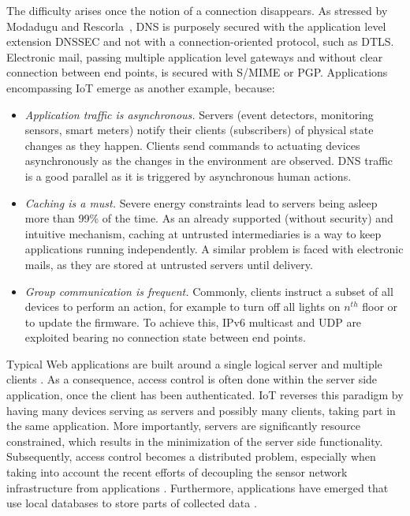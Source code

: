 \documentclass[conference]{IEEEtran}
\begin{document}
The difficulty arises once the notion of a connection disappears. As stressed by
Modadugu and Rescorla~\cite{dtls}, DNS is purposely secured with the application
level extension DNSSEC and not with a connection-oriented protocol, such as DTLS.  Electronic mail, passing multiple application level gateways and without clear connection between end points, is secured with S/MIME or PGP. Applications encompassing IoT emerge as another example, because:
 
 \begin{itemize}
 \item \textit{Application traffic is asynchronous.} Servers (event detectors, monitoring sensors, smart meters) notify their clients (subscribers) of physical state changes as they happen. Clients send commands to actuating devices asynchronously as the changes in the environment are observed. DNS traffic is a good parallel as it is triggered by  asynchronous human actions. 
 \item \textit{Caching is a must.} Severe energy constraints lead to servers
   being asleep more than 99\% of the time. As an already supported (without
   security) and intuitive mechanism, caching at untrusted intermediaries is a
   way to keep applications running independently. A similar problem is faced with electronic mails, as they are stored at untrusted servers until delivery.
 \item \textit{Group communication is frequent.} Commonly, clients instruct a subset of all devices to perform an action, for example to turn off all lights on $n^{th}$ floor or to update the firmware. To achieve this, IPv6 multicast and UDP are exploited bearing no connection state between end points.
\end{itemize}

Typical Web applications are built around a single logical server and multiple
clients \cite{rest}. As a consequence, access control is often done within the server side application, once the client has been authenticated. IoT reverses this paradigm by having many devices serving as servers and
possibly many clients, taking part in the same application. More importantly,
servers are significantly resource constrained, which results in the
minimization of the server side functionality. Subsequently, access control
becomes a distributed problem, especially when taking into account the recent efforts of decoupling the sensor network infrastructure from applications \cite{senshare, m2m-metering}. Furthermore, applications have emerged that use local databases to store parts of collected data \cite{database}.
 
\end{document}
